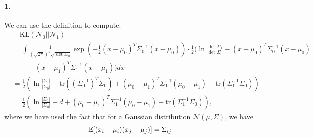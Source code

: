 \documentclass[a4 paper,12pt]{article}
\begin{document}
\paragraph{1.} We can use the definition to compute:
\begin{align*}
&\quad \text{KL}(\mathcal{N}_0||\mathcal{N}_1)\\
&=\int \frac{1}{(\sqrt{2\pi})^d\sqrt{\det \Sigma_0}}\exp\left(-\frac{1}{2}(x-\mu_0)^T\Sigma_0^{-1}(x-\mu_0)\right)\cdot \frac{1}{2}\Big(\ln \frac{\det \Sigma_1}{\det \Sigma_0}-(x-\mu_0)^T\Sigma_0^{-1}(x-\mu_0)\\
& \qquad +(x-\mu_1)^T\Sigma_1^{-1}(x-\mu_1)\Big)dx\\
&=\frac{1}{2}\left(\ln \frac{|\Sigma_1|}{|\Sigma_0|}-\text{tr}\left((\Sigma_0^{-1})^T\Sigma_0\right)+(\mu_0-\mu_1)^T\Sigma_1^{-1}(\mu_0-\mu_1)+\text{tr}\left(\Sigma_1^{-1}\Sigma_0\right)\right)\\
&=\frac{1}{2}\left(\ln \frac{|\Sigma_1|}{|\Sigma_0|}-d+(\mu_0-\mu_1)^T\Sigma_1^{-1}(\mu_0-\mu_1)+\text{tr}\left(\Sigma_1^{-1}\Sigma_0\right)\right),
\end{align*} where we have used the fact that for a Gaussian distribution $\mathcal{N}(\mu,\Sigma)$, we have
\[
\mathbb{E}[(x_i-\mu_i)(x_j-\mu_j)]=\Sigma_{ij}
\]
\end{document}
